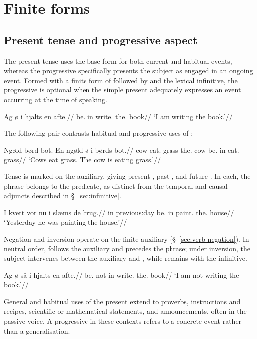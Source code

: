 \section{Finite forms}

\subsection{Present tense and progressive aspect}
\label{sec:progressive}

The present tense uses the base form for both current and habitual events, whereas the progressive specifically presents the subject as engaged in an ongoing event. Formed with a finite form of  followed by  and the lexical infinitive, the progressive is optional when the simple present adequately expresses an event occurring at the time of speaking.

\pex
\begingl
\gla Ag ø i hjalts en afte.//
\glb \First{}\Sg{} be.\Pres{} in write.\Inf{} the.\M{} book//
\glft `I am writing the book.'//
\endgl
\xe

The following pair contrasts habitual and progressive uses of :

\pex
\begingl
\gla Ngøld børd bot. En ngøld ø i børds bot.//
\glb cow eat.\Pres{} grass the.\M{} cow be.\Pres{} in eat.\Inf{} grass//
\glft `Cows eat grass. The cow is eating grass.'//
\endgl
\xe

Tense is marked on the auxiliary, giving present , past , and future . In each, the  phrase belongs to the predicate, as distinct from the temporal and causal adjuncts described in \S~\ref{sec:infinitive}.

\pex
\begingl
\gla I kvett vor nu i slæms de brug.//
\glb in previous:day be.\Pst{} \Third{}\Sg{} in paint.\Inf{} the.\F{} house//
\glft `Yesterday he was painting the house.'//
\endgl
\xe

Negation and inversion operate on the finite auxiliary (\S~\ref{sec:verb-negation}). In neutral order,  follows the auxiliary and precedes the  phrase; under inversion, the subject intervenes between the auxiliary and , while  remains with the infinitive.

\pex
\begingl
\gla Ag ø så i hjalts en afte.//
\glb \First{}\Sg{} be.\Pres{} not in write.\Inf{} the.\M{} book//
\glft `I am not writing the book.'//
\endgl
\xe

General and habitual uses of the present extend to proverbs, instructions and recipes, scientific or mathematical statements, and announcements, often in the passive voice. A progressive in these contexts refers to a concrete event rather than a generalisation.

